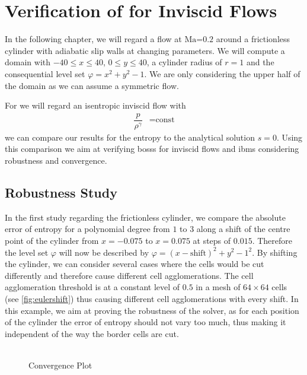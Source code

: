 \chapter{Verification of  for Inviscid Flows}
	\label{eulerVerification}
	In the following chapter, we will regard a flow at $\text{Ma=}0.2$ around a frictionless cylinder with adiabatic slip walls at changing parameters.
	We will compute a domain with  $-40 \leq x \leq 40$, $0 \leq y \leq 40$, a cylinder radius of $r = 1$ and the consequential level set $\varphi = x^2 + y^2 -1$. We are only considering the upper half of the domain as we can assume a symmetric flow. \\ \indent
	
	For we will regard an isentropic inviscid flow with 
	\begin{align}
			\dfrac{p}{\rho^\gamma} &= \text{const}
	\end{align}
	we can compare our results for the entropy to the analytical solution $s = 0$. Using this comparison we aim at verifying \gls{bosss} for inviscid flows and \gls{ibm}s considering robustness and convergence.
	
	\section{Robustness Study}
	In the first study regarding the frictionless cylinder, we compare the absolute error of entropy for a polynomial degree from $1$ to $3$ along a shift of the centre point of the cylinder from $x = -0.075$ to $x = 0.075$ at steps of $0.015$. Therefore the level set $\varphi$ will now be described by $\varphi = (x-\text{shift})^2 + y^2 - 1^2$. By shifting the cylinder, we can consider several cases where the cells would be cut differently and therefore cause different cell agglomerations. The cell agglomeration threshold is at a constant level of $0.5$ in a mesh of $64 \times 64$ cells (see \cref{fig:eulershift}) thus causing different cell agglomerations with every shift. In this example, we aim at proving the robustness of the solver, as for each position of the cylinder the error of entropy should not vary too much, thus making it independent of the way the border cells are cut. \\ \\

	\begin{figure}[htp]	
		\centering
		\caption{Convergence Plot}
		\label{shifterror}
	\end{figure}
	

